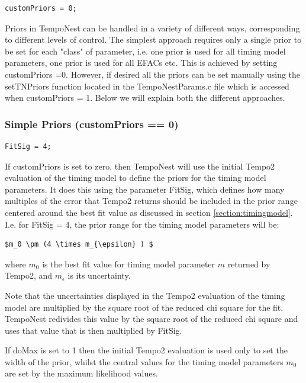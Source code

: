 \documentclass[%
 preprint,
 amsmath,amssymb,amsfonts,
 aps,
]{revtex4-1}
\begin{document}
\begin{lstlisting}
customPriors = 0;
\end{lstlisting}

Priors in TempoNest can be handled in a variety of different ways, corresponding to different levels of control.  The simplest approach requires only a single prior to be set for each "class" of parameter, i.e. one prior is used for all timing model parameters, one prior is used for all EFACs etc.  This is achieved by setting customPriors =0.   However, if desired all the priors can be set manually using the setTNPriors function located in the TempoNestParams.c file which is accessed when customPriors = 1.  Below we will explain both the different approaches.

\subsubsection{Simple Priors (customPriors == 0)}

\begin{lstlisting}
FitSig = 4;
\end{lstlisting}

If customPriors is set to zero, then TempoNest will use the initial Tempo2 evaluation of the timing model to define the priors for the timing model parameters.  It does this using the parameter FitSig, which defines how many multiples of the error that Tempo2 returns should be included in the prior range centered around the best fit value as discussed in section \ref{section:timingmodel}. I.e. for FitSig = 4, the prior range for the timing model parameters will be:

\begin{lstlisting}[mathescape]
$m_0 \pm (4 \times m_{\epsilon} ) $
\end{lstlisting}  
%
where $m_0$ is the best fit value for timing model parameter $m$ returned by Tempo2, and $m_{\epsilon}$ is its uncertainty.

Note that the uncertainties displayed in the Tempo2 evaluation of the timing model are multiplied by the square root of the reduced chi square for the fit.  TempoNest redivides this value by the square root of the reduced chi square and uses that value that is then multiplied by FitSig.

If doMax is set to 1 then the initial Tempo2 evaluation is used only to set the width of the prior, whilst the central values for the timing model parameters $m_0$ are set by the maximum likelihood values.
\end{document}
